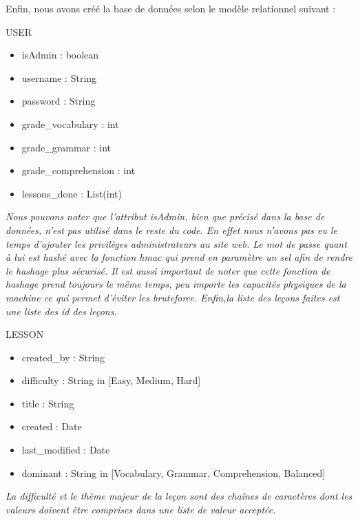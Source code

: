 Enfin, nous avons créé la base de données selon le modèle relationnel suivant :
\begin{flushleft}

USER \linebreak
\begin{itemize}
	\item isAdmin : boolean \linebreak
	\item username : String \linebreak
	\item password : String \linebreak
	\item grade\_vocabulary : int \linebreak
	\item grade\_grammar : int \linebreak
	\item grade\_comprehension : int \linebreak
	\item lessons\_done : List(int) \linebreak
\end{itemize}
	
	
\emph{Nous pouvons noter que l'attribut isAdmin, bien que précisé dans la base de données, n'est pas utilisé dans le reste du code. En effet nous n'avons pas eu le temps d'ajouter les privilèges administrateurs au site web. \linebreak Le mot de passe quant à lui est hashé avec la fonction hmac qui prend en paramètre un sel afin de rendre le hashage plus sécurisé. Il est aussi important de noter que cette fonction de hashage prend toujours le même temps, peu importe les capacités physiques de la machine ce qui permet d'éviter les bruteforce. \linebreak Enfin,la liste des leçons faites est une liste des id des leçons.} \linebreak

LESSON \linebreak
\begin{itemize}
	\item created\_by : String \linebreak
	\item difficulty : String in [Easy, Medium, Hard] \linebreak
	\item title : String \linebreak
	\item created : Date \linebreak
	\item last\_modified : Date \linebreak
	\item dominant : String in [Vocabulary, Grammar, Comprehension, Balanced] \linebreak
\end{itemize}
\emph{La difficulté et le thème majeur de la leçon sont des chaînes de caractères dont les valeurs doivent être comprises dans une liste de valeur acceptée.} \linebreak
 

\end{flushleft}
